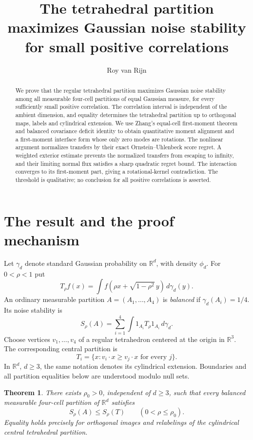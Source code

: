 \documentclass[11pt,reqno]{amsart}
\title[Tetrahedral Gaussian noise stability]{The tetrahedral partition maximizes Gaussian noise stability for small positive correlations}
\author{Roy van Rijn}
\date{}
\newtheorem{theorem}{Theorem}[section]
\theoremstyle{remark}
\newcommand{\R}{\mathbb R}
\newcommand{\ga}{\gamma}
\begin{document}
\begin{abstract}
We prove that the regular tetrahedral partition maximizes Gaussian noise
stability among all measurable four-cell partitions of equal Gaussian
measure, for every sufficiently small positive correlation. The correlation
interval is independent of the ambient dimension, and equality determines
the tetrahedral partition up to orthogonal maps, labels and cylindrical
extension. We use Zhang's equal-cell first-moment theorem and balanced
covariance deficit identity to obtain quantitative moment alignment and a
first-moment interface form whose only zero modes are rotations. The
nonlinear argument normalizes transfers by their exact Ornstein--Uhlenbeck
score regret. A weighted exterior estimate prevents the normalized
transfers from escaping to infinity, and their limiting normal flux
satisfies a sharp quadratic regret bound. The interaction converges to its
first-moment part, giving a rotational-kernel contradiction. The threshold
is qualitative; no conclusion for all positive correlations is asserted.
\end{abstract}
\maketitle

\section{The result and the proof mechanism}

Let $\ga_d$ denote standard Gaussian probability on $\R^d$, with density
$\phi_d$. For $0<\rho<1$ put
\[
 T_\rho f(x)=\int f(\rho x+\sqrt{1-\rho^2}\,y)\,d\ga_d(y).
\]
An ordinary measurable partition $A=(A_1,\ldots,A_4)$ is \emph{balanced}
if $\ga_d(A_i)=1/4$. Its noise stability is
\[
 S_\rho(A)=\sum_{i=1}^4\int 1_{A_i}T_\rho1_{A_i}\,d\ga_d.
\]
Choose vertices $v_1,\ldots,v_4$ of a regular tetrahedron centered at the
origin in $\R^3$. The corresponding central partition is
\[
 T_i=\{x:v_i\cdot x\ge v_j\cdot x\text{ for every }j\}.
\]
In $\R^d$, $d\ge3$, the same notation denotes its cylindrical extension.
Boundaries and all partition equalities below are understood modulo null sets.

\begin{theorem}\label{thm:main}
There exists $\rho_0>0$, independent of $d\ge3$, such that every balanced
measurable four-cell partition of $\R^d$ satisfies
\[
 S_\rho(A)\le S_\rho(T)\qquad(0<\rho\le\rho_0).
\]
Equality holds precisely for orthogonal images and relabelings of the
cylindrical central tetrahedral partition.
\end{theorem}
\end{document}
